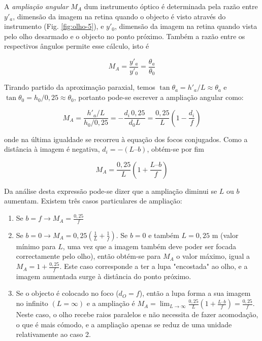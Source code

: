 \documentclass[a4paper,12pt]{article}      %
\begin{document}
A \emph{ampliação angular} $M_A$ dum instrumento óptico é determinada pela razão entre $y'_a$, dimensão da imagem na retina quando o objecto é visto através do instrumento (Fig. \ref{fig:olho-5}), e $y'_0$, dimensão da imagem na retina quando vista pelo olho desarmado e o objecto no ponto próximo. Também a razão entre os respectivos ângulos permite esse cálculo, isto é 

\begin{equation}
M_A=\frac{y'_a}{y'_0}=\frac{\theta_a}{\theta_0}
\end{equation}

Tirando partido da aproximação paraxial, temos $\tan\theta_a = h'_a / L \approx \theta_a$ e $\tan\theta_0 = h_0 / 0,25 \approx\theta_0$, portanto pode-se escrever a ampliação angular como:

\begin{equation}
M_A = \frac{h'_a/L}{h_0/0,25}=-\frac{d_i\,0,25}{d_0 L}= \frac{0,25}{L}\left(1-\frac{d_i}{f}\right) 
\end{equation}

onde na última igualdade se recorreu à equação dos focos conjugados. Como a distância à imagem é negativa, $d_i = - (L – b)$, obtém-se por fim

\begin{equation}
M_A = \frac{0,25}{L}\left(1+\frac{L–b}{f}\right)
\end{equation}

Da análise desta expressão pode-se dizer que a ampliação diminui se $L$ ou $b$ aumentam. Existem três casos particulares de ampliação:

\begin{enumerate}

\item  Se $b=f \to M_A = \frac{0,25}{f}$

\item  Se $b=0\to M_A = 0,25\left(\frac{1}{L}+\frac{1}{f}\right)$.
Se $b= 0$ e também $L = 0,25 $ m (valor mínimo para $L$, uma vez que a imagem também deve poder ser focada correctamente pelo olho), então obtém-se para $M_A$ o valor máximo, igual a $M_A = 1+\frac{0,25}{f}$. Este caso corresponde a ter a lupa "encostada" ao olho, e a imagem aumentada surge à distância do ponto próximo.

\item  Se o objecto é colocado no foco ($d_O=f$), então a lupa forma a sua imagem no infinito $(L = \infty)$ e a ampliação é $M_A = \lim_{L\to\infty}\frac{0,25}{L}\left(1+\frac{L–b}{f}\right)= \frac{0,25}{f}$. Neste caso, o olho recebe raios paralelos e não necessita de fazer acomodação, o que é mais cómodo, e a ampliação apenas se reduz de uma unidade relativamente ao caso 2.
\end{enumerate}
\end{document}
